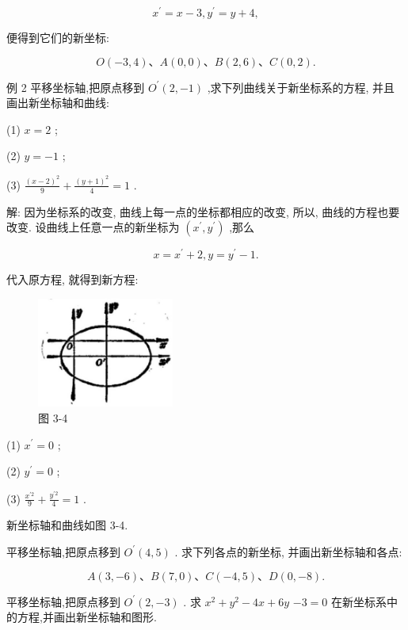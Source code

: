 \documentclass[lang=cn,newtx,10pt,scheme=chinese]{elegantbook}
\begin{document}
\[
    {x}^{\prime } = x - 3,{y}^{\prime } = y + 4,
\]

便得到它们的新坐标:

\[
  O\left( {-3,4}\right) \text{、}A\left( {0,0}\right) \text{、}B\left( {2,6}\right) \text{、}C\left( {0,2}\right) \text{.}
\]

例 2 平移坐标轴,把原点移到 \({O}^{\prime }\left( {2, - 1}\right)\) ,求下列曲线关于新坐标系的方程, 并且画出新坐标轴和曲线:

(1) \(x = 2\) ;

(2) \(y = - 1\) ;

(3) \(\frac{{\left( x - 2\right) }^{2}}{9} + \frac{{\left( y + 1\right) }^{2}}{4} = 1\) .

解: 因为坐标系的改变, 曲线上每一点的坐标都相应的改变, 所以, 曲线的方程也要改变. 设曲线上任意一点的新坐标为 \(\left( {{x}^{\prime },{y}^{\prime }}\right)\) ,那么

\[
  x = {x}^{\prime } + 2,y = {y}^{\prime } - 1.
\]

代入原方程, 就得到新方程:

\begin{figure}[h]
  \centering
  \includegraphics[max width=0.4\textwidth]{images/01912cc2-ffb6-728e-9ae7-b113ff05c64b_135_995645.jpg}
  \caption{图 3-4}
\end{figure}



(1) \({x}^{\prime } = 0\) ;

(2) \({y}^{\prime } = 0\) ;

(3) \(\frac{{x}^{\prime 2}}{9} + \frac{{y}^{\prime 2}}{4} = 1\) .

新坐标轴和曲线如图 3-4.

\begin{problemset}[练习]

\item 平移坐标轴,把原点移到 \({O}^{\prime }\left( {4,5}\right)\) . 求下列各点的新坐标, 并画出新坐标轴和各点:

\[
  A\left( {3, - 6}\right) \text{、}B\left( {7,0}\right) \text{、}C\left( {-4,5}\right) \text{、}D\left( {0, - 8}\right) .
\]

\item 平移坐标轴,把原点移到 \({O}^{\prime }\left( {2, - 3}\right)\) . 求 \({x}^{2} + {y}^{2} - {4x} + {6y}\) \(- 3 = 0\) 在新坐标系中的方程,并画出新坐标轴和图形.

\end{problemset}
\end{document}
